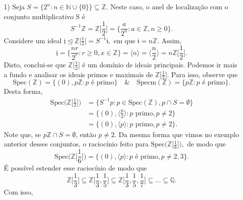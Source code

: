 \documentclass[algebraII_notes.tex]{subfiles}
\begin{document}
\begin{example}
	\begin{itemize}
		\item[1)] Seja \(S = \{2^{n}: n\in \mathbb{N}\cup\{0\}\}\subseteq \mathbb{Z}\).
		      Neste caso, o anel de localização com o conjunto multiplicativo S é
		      \[
			      S^{-1}\mathbb{Z} = \mathbb{Z}\biggl[\frac{1}{2}\biggr] = \biggl\{\frac{a}{2^{n}}: a\in \mathbb{Z}, n \geq  0\biggr\}.
		      \]
		      Considere um ideal \(\mathfrak{j}\trianglelefteq \mathbb{Z}\biggl[\frac{1}{2}\biggr] = S^{-1}\mathfrak{i}, \) em que \(\mathfrak{i} = n \mathbb{Z}\).
		      Assim,
		      \[
			      \mathfrak{j} = \biggl\{\frac{nr}{2^{r}}:r\geq 0, x\in \mathbb{Z}\biggr\} = \langle n \rangle = \langle \frac{n}{2} \rangle = n \mathbb{Z}\biggl[\frac{1}{2}\biggr].
		      \]
		      Disto, conclui-se que \(\mathbb{Z}\biggl[\frac{1}{2}\biggr]\) é um domínio de ideais principais. Podemos ir mais a fundo e analisar os ideais primos e maximais
		      de \(\mathbb{Z}\biggl[\frac{1}{2}\biggr].\) Para isso, observe que
		      \[
			      \mathrm{Spec}(\mathbb{Z}) = \{(0), p \mathbb{Z}: p \text{ é primo}\} \quad\&\quad \mathrm{Specm}(\mathbb{Z}) = \{p \mathbb{Z}: p \text{ é primo}\}.
		      \]
		      Desta forma,
		      \begin{align*}
			      \mathrm{Spec}\biggl(\mathbb{Z}\biggl[\frac{1}{2}\biggr]\biggr) & = \{S^{-1}p: p\in \mathrm{Spec}(\mathbb{Z}), p\cap S = \emptyset \} \\
			                                                                     & = \{(0), \langle \frac{p}{2} \rangle: p\text{ primo}, p \neq 2\}    \\
			                                                                     & = \{(0), \langle p \rangle: p \text{ primo}, p\neq 2\}.
		      \end{align*}
		      Note que, se \(p \mathbb{Z}\cap S = \emptyset \), então \(p\neq 2\). Da mesma forma que vimos no exemplo anterior desses conjuntos,
		      o raciocínio feito para \(\mathrm{Spec}\biggl(\mathbb{Z}\biggl[\frac{1}{6}\biggr]\biggr),\) de modo que
		      \[
			      \mathrm{Spec}\biggl(\mathbb{Z}\biggl[\frac{1}{6}\biggr]\biggr) = \{(0), \langle p \rangle: p \text{ é primo}, p\neq 2, 3\}.
		      \]
		      É possível estender esse raciocínio de modo que
		      \[
			      \mathbb{Z}\biggl[\frac{1}{3}\biggr]\subseteq \mathbb{Z}\biggl[\frac{1}{3}, \frac{1}{5}\biggr]\subseteq \mathbb{Z}\biggl[\frac{1}{3}, \frac{1}{5}, \frac{1}{7}\biggr]\subseteq \dotsc \subseteq \mathbb{Q}.
		      \]
		      Com isso,

\end{itemize}
\end{example}
\end{document}
